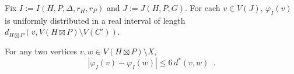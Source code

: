 \documentclass{patmorin}
\renewcommand{\ge}{\geqslant}
\renewcommand{\le}{\leqslant}
\begin{document}


\begin{obs}\label{uniform}
  Fix $I:=I(H,P,\Delta,r_H,r_P)$ and $J:=J(H,P,G)$.  For each $v\in V(J)$,
  $\varphi_I(v)$ is uniformly distributed in a real interval of length $d_{H\boxtimes P}(v,V(H\boxtimes P)\setminus V(C'))$.
\end{obs}


\begin{lem}\label{double_distance}
  For any two vertices $v,w\in V(H\boxtimes P)\setminus X$,
  \[
    |\varphi_I(v)-\varphi_I(w)| \le 6\, d^*(v,w) \enspace .
  \]
\end{lem}
\end{document}
